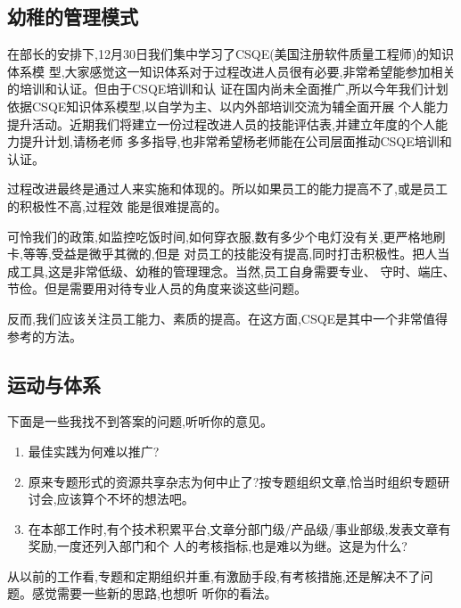 \documentclass[11pt]{article}
\begin{document}
\subsection{幼稚的管理模式}

\qlogo \begin{staff}在部长的安排下,12月30日我们集中学习了CSQE(美国注册软件质量工程师)的知识体系模
  型,大家感觉这一知识体系对于过程改进人员很有必要,非常希望能参加相关的培训和认证。但由于CSQE培训和认
  证在国内尚未全面推广,所以今年我们计划依据CSQE知识体系模型,以自学为主、以内外部培训交流为辅全面开展
  个人能力提升活动。近期我们将建立一份过程改进人员的技能评估表,并建立年度的个人能力提升计划,请杨老师
  多多指导,也非常希望杨老师能在公司层面推动CSQE培训和认证。
\end{staff}

\begin{yang}
\ylogo 过程改进最终是通过人来实施和体现的。所以如果员工的能力提高不了,或是员工的积极性不高,过程效
能是很难提高的。

可怜我们的政策,如监控吃饭时间,如何穿衣服,数有多少个电灯没有关,更严格地刷卡,等等,受益是微乎其微的,但是
对员工的技能没有提高,同时打击积极性。把人当成工具,这是非常低级、幼稚的管理理念。当然,员工自身需要专业、
守时、端庄、节俭。但是需要用对待专业人员的角度来谈这些问题。

反而,我们应该关注员工能力、素质的提高。在这方面,CSQE是其中一个非常值得参考的方法。
\end{yang}


\subsection{运动与体系}
\begin{staff}
\qlogo 下面是一些我找不到答案的问题,听听你的意见。
\begin{enumerate}
  \item 最佳实践为何难以推广?
  \item  原来专题形式的资源共享杂志为何中止了?按专题组织文章,恰当时组织专题研讨会,应该算个不坏的想法吧。
  \item 在本部工作时,有个技术积累平台,文章分部门级/产品级/事业部级,发表文章有奖励,一度还列入部门和个
    人的考核指标,也是难以为继。这是为什么?
\end{enumerate}

从以前的工作看,专题和定期组织并重,有激励手段,有考核措施,还是解决不了问题。感觉需要一些新的思路,也想听
听你的看法。
\end{staff}
\end{document}
